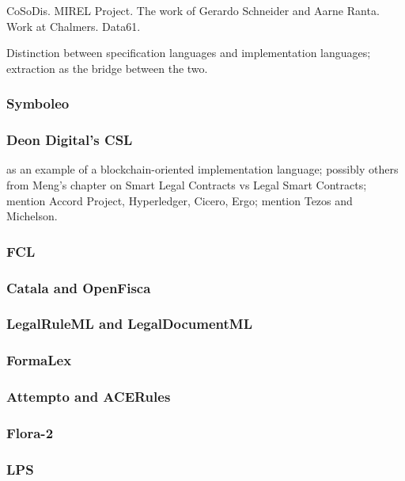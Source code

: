 \documentclass{IOS-Book-Article}
\begin{document}
CoSoDis. MIREL Project. The work of Gerardo Schneider and Aarne Ranta. Work at Chalmers. Data61.

Distinction between specification languages and implementation languages; extraction as the bridge between the two.

\subsubsection{Symboleo}

\subsubsection{Deon Digital's CSL}

as an example of a blockchain-oriented implementation language; possibly others from Meng's chapter on Smart Legal Contracts vs Legal Smart Contracts; mention Accord Project, Hyperledger, Cicero, Ergo; mention Tezos and Michelson.

\subsubsection{FCL}

\subsubsection{Catala and OpenFisca}

\subsubsection{LegalRuleML and LegalDocumentML}

\subsubsection{FormaLex}

\subsubsection{Attempto and ACERules}

\subsubsection{Flora-2}

\subsubsection{LPS}
\end{document}
